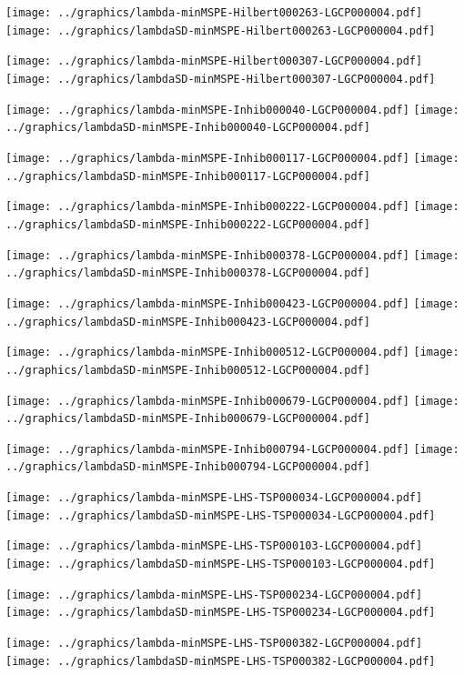\documentclass[review]{elsarticle}
\begin{document}
\texttt{[image: ../graphics/lambda-minMSPE-Hilbert000263-LGCP000004.pdf]}
\texttt{[image: ../graphics/lambdaSD-minMSPE-Hilbert000263-LGCP000004.pdf]}

\texttt{[image: ../graphics/lambda-minMSPE-Hilbert000307-LGCP000004.pdf]}
\texttt{[image: ../graphics/lambdaSD-minMSPE-Hilbert000307-LGCP000004.pdf]}

\texttt{[image: ../graphics/lambda-minMSPE-Inhib000040-LGCP000004.pdf]}
\texttt{[image: ../graphics/lambdaSD-minMSPE-Inhib000040-LGCP000004.pdf]}

\texttt{[image: ../graphics/lambda-minMSPE-Inhib000117-LGCP000004.pdf]}
\texttt{[image: ../graphics/lambdaSD-minMSPE-Inhib000117-LGCP000004.pdf]}

\texttt{[image: ../graphics/lambda-minMSPE-Inhib000222-LGCP000004.pdf]}
\texttt{[image: ../graphics/lambdaSD-minMSPE-Inhib000222-LGCP000004.pdf]}

\texttt{[image: ../graphics/lambda-minMSPE-Inhib000378-LGCP000004.pdf]}
\texttt{[image: ../graphics/lambdaSD-minMSPE-Inhib000378-LGCP000004.pdf]}

\texttt{[image: ../graphics/lambda-minMSPE-Inhib000423-LGCP000004.pdf]}
\texttt{[image: ../graphics/lambdaSD-minMSPE-Inhib000423-LGCP000004.pdf]}

\texttt{[image: ../graphics/lambda-minMSPE-Inhib000512-LGCP000004.pdf]}
\texttt{[image: ../graphics/lambdaSD-minMSPE-Inhib000512-LGCP000004.pdf]}

\texttt{[image: ../graphics/lambda-minMSPE-Inhib000679-LGCP000004.pdf]}
\texttt{[image: ../graphics/lambdaSD-minMSPE-Inhib000679-LGCP000004.pdf]}

\texttt{[image: ../graphics/lambda-minMSPE-Inhib000794-LGCP000004.pdf]}
\texttt{[image: ../graphics/lambdaSD-minMSPE-Inhib000794-LGCP000004.pdf]}

\texttt{[image: ../graphics/lambda-minMSPE-LHS-TSP000034-LGCP000004.pdf]}
\texttt{[image: ../graphics/lambdaSD-minMSPE-LHS-TSP000034-LGCP000004.pdf]}

\texttt{[image: ../graphics/lambda-minMSPE-LHS-TSP000103-LGCP000004.pdf]}
\texttt{[image: ../graphics/lambdaSD-minMSPE-LHS-TSP000103-LGCP000004.pdf]}

\texttt{[image: ../graphics/lambda-minMSPE-LHS-TSP000234-LGCP000004.pdf]}
\texttt{[image: ../graphics/lambdaSD-minMSPE-LHS-TSP000234-LGCP000004.pdf]}

\texttt{[image: ../graphics/lambda-minMSPE-LHS-TSP000382-LGCP000004.pdf]}
\texttt{[image: ../graphics/lambdaSD-minMSPE-LHS-TSP000382-LGCP000004.pdf]}
\end{document}
